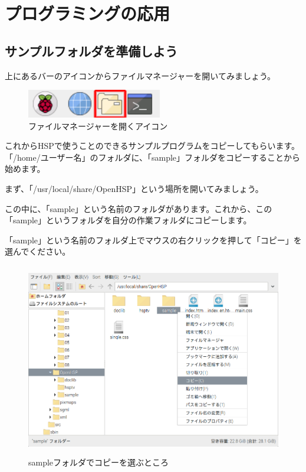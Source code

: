 \newpage
\section{プログラミングの応用}

\subsection{サンプルフォルダを準備しよう}

上にあるバーのアイコンからファイルマネージャーを開いてみましょう。

\begin{figure}[H]
    \begin{center}
      \includegraphics[keepaspectratio,width=5.898cm,height=1.242cm]{text04-img/s_filemanager.png}
      \caption{ファイルマネージャーを開くアイコン}
    \end{center}
    \label{fig:prog_menu}
\end{figure}

これからHSPで使うことのできるサンプルプログラムをコピーしてもらいます。「/home/ユーザー名」のフォルダに、「sample」フォルダをコピーすることから始めます。

まず、「/usr/local/share/OpenHSP」という場所を開いてみましょう。

この中に、「sample」という名前のフォルダがあります。これから、この「sample」というフォルダを自分の作業フォルダにコピーします。

「sample」という名前のフォルダ上でマウスの右クリックを押して「コピー」を選んでください。


\begin{figure}[H]
    \begin{center}
      \includegraphics[keepaspectratio,width=11.232cm,height=8.424cm]{text04-img/s_ome04e.png}
      \caption{sampleフォルダでコピーを選ぶところ}
    \end{center}
    \label{fig:prog_menu}
\end{figure}

